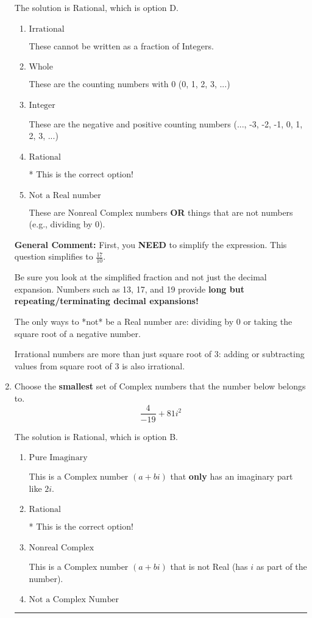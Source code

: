 \documentclass{extbook}[14pt]
\newcommand{\litem}[1]{\item #1

\rule{\textwidth}{0.4pt}}
\begin{document}
\begin{enumerate}
{The solution is \( \text{Rational} \), which is option D.\begin{enumerate}[label=\Alph*.]
\item \( \text{Irrational} \)

These cannot be written as a fraction of Integers.
\item \( \text{Whole} \)

These are the counting numbers with 0 (0, 1, 2, 3, ...)
\item \( \text{Integer} \)

These are the negative and positive counting numbers (..., -3, -2, -1, 0, 1, 2, 3, ...)
\item \( \text{Rational} \)

* This is the correct option!
\item \( \text{Not a Real number} \)

These are Nonreal Complex numbers \textbf{OR} things that are not numbers (e.g., dividing by 0).
\end{enumerate}

\textbf{General Comment:} First, you \textbf{NEED} to simplify the expression. This question simplifies to $\frac{17}{10}$. 
 
 Be sure you look at the simplified fraction and not just the decimal expansion. Numbers such as 13, 17, and 19 provide \textbf{long but repeating/terminating decimal expansions!} 
 
 The only ways to *not* be a Real number are: dividing by 0 or taking the square root of a negative number. 
 
 Irrational numbers are more than just square root of 3: adding or subtracting values from square root of 3 is also irrational.
}
\litem{
Choose the \textbf{smallest} set of Complex numbers that the number below belongs to.
\[ \frac{4}{-19}+81i^2 \]

The solution is \( \text{Rational} \), which is option B.\begin{enumerate}[label=\Alph*.]
\item \( \text{Pure Imaginary} \)

This is a Complex number $(a+bi)$ that \textbf{only} has an imaginary part like $2i$.
\item \( \text{Rational} \)

* This is the correct option!
\item \( \text{Nonreal Complex} \)

This is a Complex number $(a+bi)$ that is not Real (has $i$ as part of the number).
\item \( \text{Not a Complex Number} \)


\end{enumerate}}
\end{enumerate}
\end{document}

